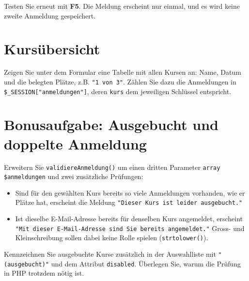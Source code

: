 \documentclass[a4paper,12pt]{article}
\begin{document}
Testen Sie erneut mit \textbf{F5}. Die Meldung erscheint nur einmal, und es wird keine zweite Anmeldung gespeichert.

\section{Kursübersicht}

Zeigen Sie unter dem Formular eine Tabelle mit allen Kursen an: Name, Datum und die belegten Plätze, z.B. \texttt{"{}1 von 3"{}}. Zählen Sie dazu die Anmeldungen in \texttt{\$\_SESSION["{}anmeldungen"{}]}, deren \texttt{kurs} dem jeweiligen Schlüssel entspricht.

\section{Bonusaufgabe: Ausgebucht und doppelte Anmeldung}

Erweitern Sie \texttt{validiereAnmeldung()} um einen dritten Parameter \texttt{array \$anmeldungen} und zwei zusätzliche Prüfungen:

\begin{itemize}
    \item Sind für den gewählten Kurs bereits so viele Anmeldungen vorhanden, wie er Plätze hat, erscheint die Meldung \texttt{"{}Dieser Kurs ist leider ausgebucht."{}}
    \item Ist dieselbe E-Mail-Adresse bereits für denselben Kurs angemeldet, erscheint \texttt{"{}Mit dieser E-Mail-Adresse sind Sie bereits angemeldet."{}} Gross- und Kleinschreibung sollen dabei keine Rolle spielen (\texttt{strtolower()}).
\end{itemize}

Kennzeichnen Sie ausgebuchte Kurse zusätzlich in der Auswahlliste mit \texttt{"{}(ausgebucht)"{}} und dem Attribut \texttt{disabled}. Überlegen Sie, warum die Prüfung in PHP trotzdem nötig ist.
\end{document}
